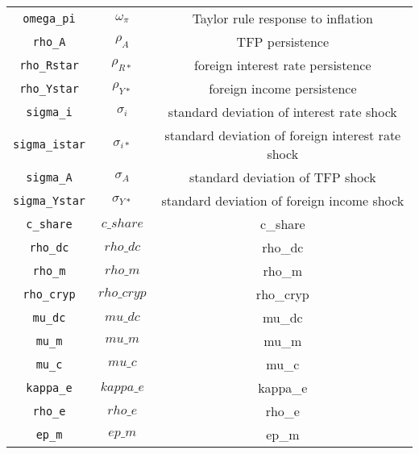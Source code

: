 \begin{center}
\begin{longtable}{ccc}
\texttt{omega\_pi} & $\omega_{\pi}$ & Taylor rule response to inflation\\
\texttt{rho\_A} & $\rho_{A}$ & TFP persistence\\
\texttt{rho\_Rstar} & $\rho_{R*}$ & foreign interest rate persistence\\
\texttt{rho\_Ystar} & $\rho_{Y*}$ & foreign income persistence\\
\texttt{sigma\_i} & $\sigma_{i}$ & standard deviation of interest rate shock\\
\texttt{sigma\_istar} & $\sigma_{i*}$ & standard deviation of foreign interest rate shock\\
\texttt{sigma\_A} & $\sigma_{A}$ & standard deviation of TFP shock\\
\texttt{sigma\_Ystar} & $\sigma_{Y*}$ & standard deviation of foreign income shock\\
\texttt{c\_share} & $c\_share$ & c\_share\\
\texttt{rho\_dc} & $rho\_dc$ & rho\_dc\\
\texttt{rho\_m} & $rho\_m$ & rho\_m\\
\texttt{rho\_cryp} & $rho\_cryp$ & rho\_cryp\\
\texttt{mu\_dc} & $mu\_dc$ & mu\_dc\\
\texttt{mu\_m} & $mu\_m$ & mu\_m\\
\texttt{mu\_c} & $mu\_c$ & mu\_c\\
\texttt{kappa\_e} & $kappa\_e$ & kappa\_e\\
\texttt{rho\_e} & $rho\_e$ & rho\_e\\
\texttt{ep\_m} & $ep\_m$ & ep\_m\\
\hline%
\end{longtable}
\end{center}
